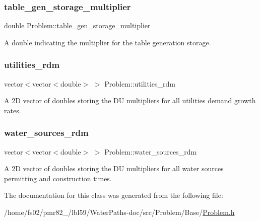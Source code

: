 \subsubsection{\texorpdfstring{table\+\_\+gen\+\_\+storage\+\_\+multiplier}{table\_gen\_storage\_multiplier}}
{\footnotesize\ttfamily double Problem\+::table\+\_\+gen\+\_\+storage\+\_\+multiplier\hspace{0.3cm}{\ttfamily [protected]}}



A double indicating the multiplier for the table generation storage. 

\mbox{\label{classProblem_aa4f6db22580c8d8a941e83556f4f5208}} 
\subsubsection{\texorpdfstring{utilities\+\_\+rdm}{utilities\_rdm}}
{\footnotesize\ttfamily vector$<$vector$<$double$>$ $>$ Problem\+::utilities\+\_\+rdm\hspace{0.3cm}{\ttfamily [protected]}}



A 2D vector of doubles storing the DU multipliers for all utilities\textquotesingle{} demand growth rates. 

\mbox{\label{classProblem_ace43e5306285f0d91a199a4bd5a38922}} 
\subsubsection{\texorpdfstring{water\+\_\+sources\+\_\+rdm}{water\_sources\_rdm}}
{\footnotesize\ttfamily vector$<$vector$<$double$>$ $>$ Problem\+::water\+\_\+sources\+\_\+rdm\hspace{0.3cm}{\ttfamily [protected]}}



A 2D vector of doubles storing the DU multipliers for all water sources\textquotesingle{} permitting and construction times. 



The documentation for this class was generated from the following file\+:\begin{DoxyCompactItemize}
\item 
/home/fs02/pmr82\+\_/lbl59/\+Water\+Paths-\/doc/src/\+Problem/\+Base/\mbox{\hyperlink{Problem_8h}{Problem.\+h}}\end{DoxyCompactItemize}
